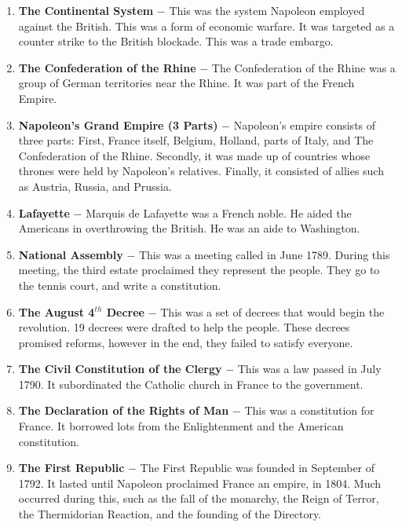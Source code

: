 \documentclass[12pt]{article}
\begin{document}
\begin{enumerate}
\item \textbf{The Continental System} $-$ This was the system Napoleon employed against the British. This was a form of economic warfare. It was targeted as a counter strike to the British blockade. This was a trade embargo.

\item \textbf{The Confederation of the Rhine} $-$ The Confederation of the Rhine was a group of German territories near the Rhine. It was part of the French Empire.

\item \textbf{Napoleon's Grand Empire (3 Parts)} $-$ Napoleon's empire consists of three parts: First, France itself, Belgium, Holland, parts of Italy, and The Confederation of the Rhine. Secondly, it was made up of countries whose thrones were held by Napoleon's relatives. Finally, it consisted of allies such as Austria, Russia, and Prussia.

\item \textbf{Lafayette} $-$ Marquis de Lafayette was a French noble. He aided the Americans in overthrowing the British. He was an aide to Washington.

\item \textbf{National Assembly} $-$ This was a meeting called in June 1789. During this meeting, the third estate proclaimed they represent the people. They go to the tennis court, and write a constitution.

\item \textbf{The August 4$^{th}$ Decree} $-$ This was a set of decrees that would begin the revolution. 19 decrees were drafted to help the people. These decrees promised reforms, however in the end, they failed to satisfy everyone.

\item \textbf{The Civil Constitution of the Clergy} $-$ This was a law passed in July 1790. It subordinated the Catholic church in France to the government.

\item \textbf{The Declaration of the Rights of Man} $-$ This was a constitution for France. It borrowed lots from the Enlightenment and the American constitution.

\item \textbf{The First Republic} $-$ The First Republic was founded in September of 1792. It lasted until Napoleon proclaimed France an empire, in 1804. Much occurred during this, such as the fall of the monarchy, the Reign of Terror, the Thermidorian Reaction, and the founding of the Directory.


\end{enumerate}
\end{document}
